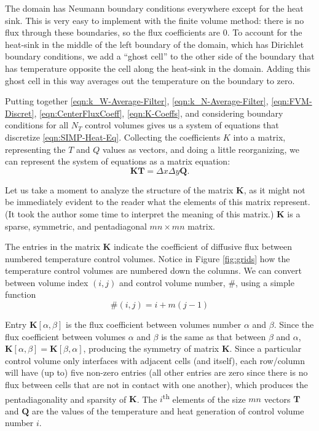 The domain has Neumann boundary conditions everywhere except for the heat sink. This is very easy to implement with the finite volume method: there is no flux through these boundaries, so the flux coefficients are 0. To account for the heat-sink in the middle of the left boundary of the domain, which has Dirichlet boundary conditions, we add a ``ghost cell'' to the other side of the boundary that has temperature opposite the cell along the heat-sink in the domain. Adding this ghost cell in this way averages out the temperature on the boundary to zero.

Putting together \eqref{eqn:k_W-Average-Filter}, \eqref{eqn:k_N-Average-Filter}, \eqref{eqn:FVM-Discret}, \eqref{eqn:CenterFluxCoeff}, \eqref{eqn:K-Coeffs}, and considering boundary conditions for all $N_T$ control volumes gives us a system of equations that discretize \eqref{eqn:SIMP-Heat-Eq}. Collecting the coefficients $K$ into a matrix, representing the $T$ and $Q$ values as vectors, and doing a little reorganizing, we can represent the system of equations as a matrix equation:
\begin{equation}
	\mathbf{K}\mathbf{T}=\Delta x\Delta y\mathbf{Q}.\label{eqn:KTQ-Matrix-Eqn}
\end{equation}

Let us take a moment to analyze the structure of the matrix $\mathbf{K}$, as it might not be immediately evident to the reader what the elements of this matrix represent. (It took the author some time to interpret the meaning of this matrix.) $\mathbf{K}$ is a sparse, symmetric, and pentadiagonal $mn\times mn$ matrix.

The entries in the matrix $\mathbf{K}$ indicate the coefficient of diffusive flux between numbered temperature control volumes. Notice in Figure \ref{fig:grids} how the temperature control volumes are numbered down the columns. We can convert between volume index $(i,j)$ and control volume number, $\#$, using a simple function
\begin{equation}
	\#(i,j)=i+m(j-1)\label{eqn:cord2num}
\end{equation}

Entry $\mathbf{K}[\alpha,\beta]$ is the flux coefficient between volumes number $\alpha$ and $\beta$. Since the flux coefficient between volumes $\alpha$ and $\beta$ is the same as that between $\beta$ and $\alpha$, $\mathbf{K}[\alpha,\beta]=\mathbf{K}[\beta,\alpha]$, producing the symmetry of matrix $\mathbf{K}$. Since a particular control volume only interfaces with adjacent cells (and itself), each row/column will have (up to) five non-zero entries (all other entries are zero since there is no flux between cells that are not in contact with one another), which produces the pentadiagonality and sparsity of $\mathbf{K}$. The $i$\textsuperscript{th} elements of the size $mn$ vectors $\mathbf{T}$ and $\mathbf{Q}$ are the values of the temperature and heat generation of control volume number $i$.

